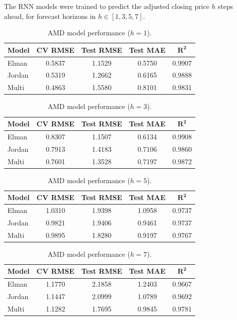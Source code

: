 \documentclass[conference]{IEEEtran}
\begin{document}
The RNN models were trained to predict the adjusted closing price $h$ steps ahead, for forecast horizons in $h \in [1,3,5,7]$.

\begin{table}[H]
\centering
\caption{AMD model performance ($h=1$).}
\label{tab:amd_h1}
\begin{tabular}{lcccc}
\toprule
\textbf{Model} & \textbf{CV RMSE} & \textbf{Test RMSE} & \textbf{Test MAE} & $\mathbf{R^2}$ \\
\midrule
Elman  & 0.5837 & 1.1529 & 0.5750 & 0.9907 \\
Jordan & 0.5319 & 1.2662 & 0.6165 & 0.9888 \\
Multi  & 0.4863 & 1.5580 & 0.8101 & 0.9831 \\
\bottomrule
\end{tabular}
\end{table}

\begin{table}[H]
\centering
\caption{AMD model performance ($h=3$).}
\label{tab:amd_h3}
\begin{tabular}{lcccc}
\toprule
\textbf{Model} & \textbf{CV RMSE} & \textbf{Test RMSE} & \textbf{Test MAE} & $\mathbf{R^2}$ \\
\midrule
Elman  & 0.8307 & 1.1507 & 0.6134 & 0.9908 \\
Jordan & 0.7913 & 1.4183 & 0.7106 & 0.9860 \\
Multi  & 0.7601 & 1.3528 & 0.7197 & 0.9872 \\
\bottomrule
\end{tabular}
\end{table}

\begin{table}[H]
\centering
\caption{AMD model performance ($h=5$).}
\label{tab:amd_h5}
\begin{tabular}{lcccc}
\toprule
\textbf{Model} & \textbf{CV RMSE} & \textbf{Test RMSE} & \textbf{Test MAE} & $\mathbf{R^2}$ \\
\midrule
Elman  & 1.0310 & 1.9398 & 1.0958 & 0.9737 \\
Jordan & 0.9821 & 1.9406 & 0.9461 & 0.9737 \\
Multi  & 0.9895 & 1.8280 & 0.9197 & 0.9767 \\
\bottomrule
\end{tabular}
\end{table}

\begin{table}[H]
\centering
\caption{AMD model performance ($h=7$).}
\label{tab:amd_h7}
\begin{tabular}{lcccc}
\toprule
\textbf{Model} & \textbf{CV RMSE} & \textbf{Test RMSE} & \textbf{Test MAE} & $\mathbf{R^2}$ \\
\midrule
Elman  & 1.1770 & 2.1858 & 1.2403 & 0.9667 \\
Jordan & 1.1447 & 2.0999 & 1.0789 & 0.9692 \\
Multi  & 1.1282 & 1.7695 & 0.9845 & 0.9781 \\
\bottomrule
\end{tabular}
\end{table}
\end{document}
